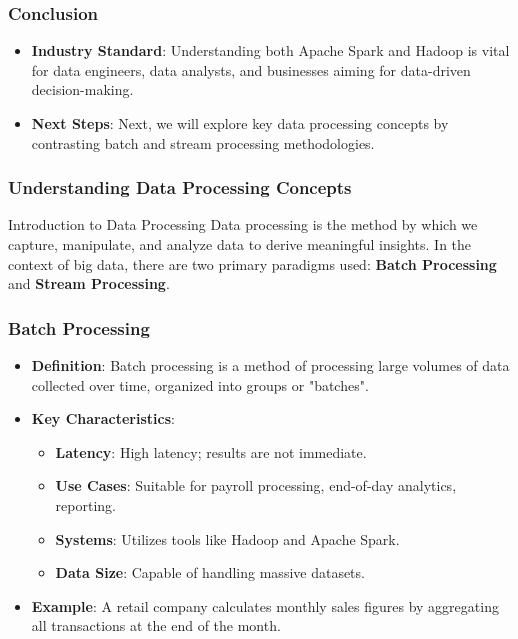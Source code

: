 \documentclass{beamer}
\begin{document}
\begin{frame}[fragile]
    \frametitle{Conclusion}
    \begin{itemize}
        \item \textbf{Industry Standard}: Understanding both Apache Spark and Hadoop is vital for data engineers, data analysts, and businesses aiming for data-driven decision-making.
        \item \textbf{Next Steps}: Next, we will explore key data processing concepts by contrasting batch and stream processing methodologies.
    \end{itemize}
\end{frame}

\begin{frame}[fragile]
    \frametitle{Understanding Data Processing Concepts}
    \begin{block}{Introduction to Data Processing}
        Data processing is the method by which we capture, manipulate, and analyze data to derive meaningful insights. 
        In the context of big data, there are two primary paradigms used: \textbf{Batch Processing} and \textbf{Stream Processing}.
    \end{block}
\end{frame}

\begin{frame}[fragile]
    \frametitle{Batch Processing}
    \begin{itemize}
        \item \textbf{Definition}: Batch processing is a method of processing large volumes of data collected over time, organized into groups or "batches".
        
        \item \textbf{Key Characteristics}:
        \begin{itemize}
            \item \textbf{Latency}: High latency; results are not immediate.
            \item \textbf{Use Cases}: Suitable for payroll processing, end-of-day analytics, reporting.
            \item \textbf{Systems}: Utilizes tools like Hadoop and Apache Spark.
            \item \textbf{Data Size}: Capable of handling massive datasets.
        \end{itemize}
        
        \item \textbf{Example}: A retail company calculates monthly sales figures by aggregating all transactions at the end of the month.
    \end{itemize}
\end{frame}
\end{document}
